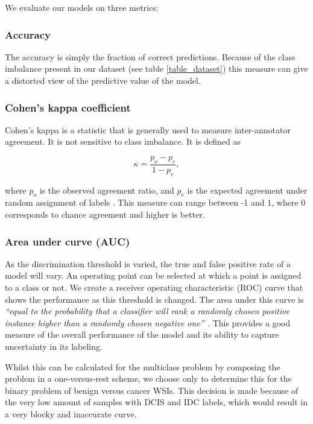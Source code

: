 \documentclass[journal]{IEEEtran}
\begin{document}
We evaluate our models on three metrics:
\subsubsection{Accuracy}
The accuracy is simply the fraction of correct predictions. Because of the class imbalance present in our dataset (see table \ref{table_dataset}) this measure can give a distorted view of the predictive value of the model.

\subsubsection{Cohen's kappa coefficient}
Cohen's kappa is a statistic that is generally used to measure inter-annotator agreement. It is not sensitive to class imbalance. It is defined as

$$\kappa = \frac{p_o-p_e}{1-p_e},$$

where $p_o$ is the observed agreement ratio, and $p_e$ is the expected agreement under random assignment of labels \cite{artstein2008inter}. This measure can range between -1 and 1, where 0 corresponds to chance agreement and higher is better.

\subsubsection{Area under curve (AUC)}
As the discrimination threshold is varied, the true and false positive rate of a model will vary. An operating point can be selected at which a point is assigned to a class or not. We create a receiver operating characteristic (ROC) curve that shows the performance as this threshold is changed. The area under this curve is \textit{``equal to the probability that a classifier will rank a randomly chosen positive instance higher than a randomly chosen negative one'' \cite{Fawcett:2006:IRA:1159473.1159475}.} This provides a good measure of the overall performance of the model and its ability to capture uncertainty in its labeling.

Whilst this can be calculated for the multiclass problem by composing the problem in a one-versus-rest scheme, we choose only to determine this for the binary problem of benign versus cancer WSIs. This decision is made because of the very low amount of samples with DCIS and IDC labels, which would result in a very blocky and inaccurate curve.
\end{document}
